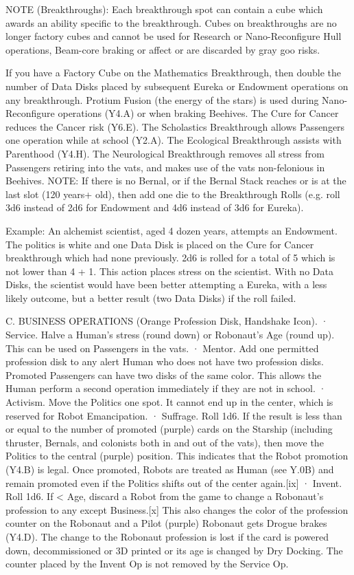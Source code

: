 \documentclass[a4paper]{book}
\begin{document}
NOTE (Breakthroughs): Each breakthrough spot can contain a cube which awards an ability specific to the breakthrough. Cubes on breakthroughs are no longer factory cubes and cannot be used for Research or Nano-Reconfigure Hull operations, Beam-core braking or affect or are discarded by gray goo risks.

If you have a Factory Cube on the Mathematics Breakthrough, then double the number of Data Disks placed by subsequent Eureka or Endowment operations on any breakthrough. Protium Fusion (the energy of the stars) is used during Nano-Reconfigure operations (Y4.A) or when braking Beehives. The Cure for Cancer reduces the Cancer risk (Y6.E). The Scholastics Breakthrough allows Passengers one operation while at school (Y2.A). The Ecological Breakthrough assists with Parenthood (Y4.H). The Neurological Breakthrough removes all stress from Passengers retiring into the vats, and makes use of the vats non-felonious in Beehives. 
NOTE: If there is no Bernal, or if the Bernal Stack reaches or is at the last slot (120 years+ old), then add one die to the Breakthrough Rolls (e.g. roll 3d6 instead of 2d6 for Endowment and 4d6 instead of 3d6 for Eureka).

Example: An alchemist scientist, aged 4 dozen years, attempts an Endowment. The politics is white and one Data Disk is placed on the Cure for Cancer breakthrough which had none previously. 2d6 is rolled for a total of 5 which is not lower than 4 + 1. This action places stress on the scientist. With no Data Disks, the scientist would have been better attempting a Eureka, with a less likely outcome, but a better result (two Data Disks) if the roll failed.
 
C. BUSINESS OPERATIONS (Orange Profession Disk, Handshake Icon).
·       Service. Halve a Human’s stress (round down) or Robonaut’s Age (round up). This can be used on Passengers in the vats.
·       Mentor. Add one permitted profession disk to any alert Human who does not have two profession disks. Promoted Passengers can have two disks of the same color. This allows the Human perform a second operation immediately if they are not in school.
·       Activism. Move the Politics one spot. It cannot end up in the center, which is reserved for Robot Emancipation.
·       Suffrage. Roll 1d6. If the result is less than or equal to the number of promoted (purple) cards on the Starship (including thruster, Bernals, and colonists both in and out of the vats), then move the Politics to the central (purple) position. This indicates that the Robot promotion (Y4.B) is legal. Once promoted, Robots are treated as Human (see Y.0B) and remain promoted even if the Politics shifts out of the center again.[ix]
·       Invent. Roll 1d6. If < Age, discard a Robot from the game to change a Robonaut's profession to any except Business.[x] This also changes the color of the profession counter on the Robonaut and a Pilot (purple) Robonaut gets Drogue brakes (Y4.D). The change to the Robonaut profession is lost if the card is powered down, decommissioned or 3D printed or its age is changed by Dry Docking. The counter placed by the Invent Op is not removed by the Service Op.
\end{document}
